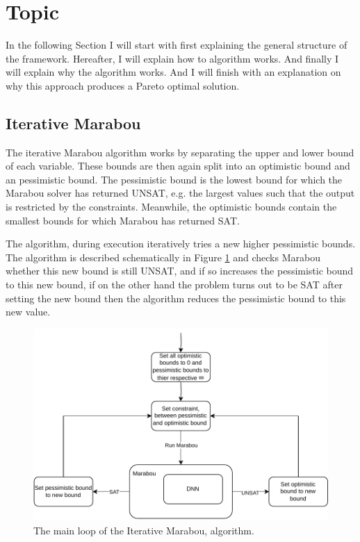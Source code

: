 \documentclass[../main.tex]{subfiles}
\begin{document}
\section{Topic}\label{sec:topic}
In the following Section I will start with first explaining the general structure of the framework. Hereafter, I will explain how to algorithm works. And finally I will explain why the algorithm works. And I will finish with an explanation on why this approach produces a Pareto optimal solution.

\subsection*{Iterative Marabou}
The iterative Marabou algorithm works by separating the upper and lower bound of each variable. These bounds are then again split into an optimistic bound and an pessimistic bound. The pessimistic bound is the lowest bound for which the Marabou solver has returned UNSAT, e.g. the largest values such that the output is restricted by the constraints. Meanwhile, the optimistic bounds contain the smallest bounds for which Marabou has returned SAT.

The algorithm, during execution iteratively tries a new higher pessimistic bounds. The algorithm is described schematically in Figure \ref{fig:iter-marabou} and checks Marabou whether this new bound is still UNSAT, and if so increases the pessimistic bound to this new bound, if on the other hand the problem turns out to be SAT after setting the new bound then the algorithm reduces the pessimistic bound to this new value. 

\begin{figure}[H]
    \centering
    \includegraphics[width=0.75\linewidth]{figures/iterative_reluplex.pdf}
    \caption{The main loop of the Iterative Marabou, algorithm.}\label{fig:iter-marabou}
\end{figure}
\end{document}
